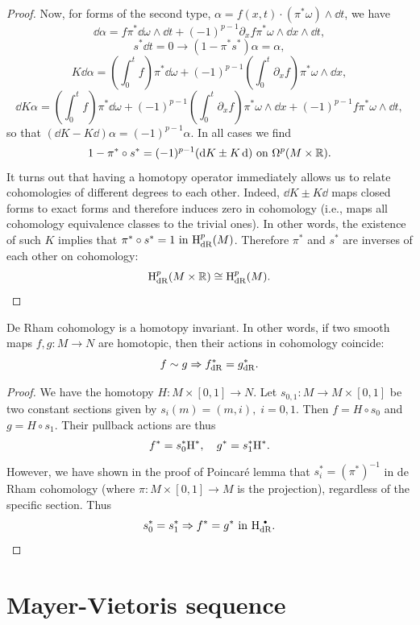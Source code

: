 \begin{proof}
    Now, for forms of the second type, $\alpha=f(x,t)\cdot(\pi^\ast\omega)\wedge\dd t$, we have
    \[\dd\alpha=f\pi^\ast\dd\omega\wedge\dd t+(-1)^{p-1}\partial_x f\pi^\ast\omega\wedge\dd x\wedge\dd t,\]
    \[s^\ast\dd t=0\rightarrow (1-\pi^\ast s^\ast)\alpha=\alpha,\]
    \[K\dd \alpha=\left(\int_0^t f\right)\pi^\ast\dd\omega+(-1)^{p-1}\left(\int_0^t\partial_x f\right)\pi^\ast\omega\wedge\dd x,\]
    \[\dd K\alpha=\left(\int_0^t f\right)\pi^\ast\dd\omega+(-1)^{p-1}\left(\int_0^t\partial_x f\right)\pi^\ast\omega\wedge\dd x+(-1)^{p-1}f\pi^\ast\omega\wedge\dd t,\]
    so that $(\dd K-K \dd)\alpha=(-1)^{p-1}\alpha$.
    In all cases we find
    \[1-\pi^\ast\circ s^\ast=(-1)^{p-1}(\dd K\pm K \dd) \text{ on }\Omega^p(M\times\bbR).\]
    It turns out that having a homotopy operator immediately allows us to relate cohomologies of different degrees to each other. Indeed, $\dd K\pm K\dd$ maps closed forms to exact forms and therefore induces zero in cohomology (i.e., maps all cohomology equivalence classes to the trivial ones).
    In other words, the existence of such $K$ implies that 
    $\pi^\ast\circ s^\ast=1 \text{ in }\rmH^p_{\rm dR}(M)$.
    Therefore $\pi^\ast$ and $s^\ast$ are inverses of each other on cohomology:
    \[\rmH^p_{\rm dR}(M\times\bbR)\cong \rmH^p_{\rm dR}(M).\]
\end{proof}

\begin{cor}
    De Rham cohomology is a homotopy invariant. In other words, if two smooth maps $f,g:M\to N$ are homotopic, then their actions in cohomology coincide:
    \[f\sim g\implies f^\ast_{\rm dR}=g^\ast_{\rm dR}.\]
\end{cor}
\begin{proof}
    We have the homotopy $H:M\times[0,1]\to N$. Let $s_{0,1}:M\to M\times [0,1]$ be two constant sections given by $s_i(m)=(m,i),\;i=0,1$. Then $f=H\circ s_0$ and $g=H\circ s_1$. Their pullback actions are thus
    \[f^\ast=s_0^\ast \rmH^\ast,\quad g^\ast=s_1^\ast \rmH^\ast.\]
    However, we have shown in the proof of Poincar\'e lemma that $s_i^\ast=(\pi^\ast)^{-1}$ in de Rham cohomology (where $\pi:M\times [0,1]\to M$ is the projection), regardless of the specific section. Thus
    \[s_0^\ast=s_1^\ast\implies f^\ast=g^\ast \text{ in }\rmH^{\smbullet }_{\rm dR}.\]
\end{proof}


\section{Mayer-Vietoris sequence}

